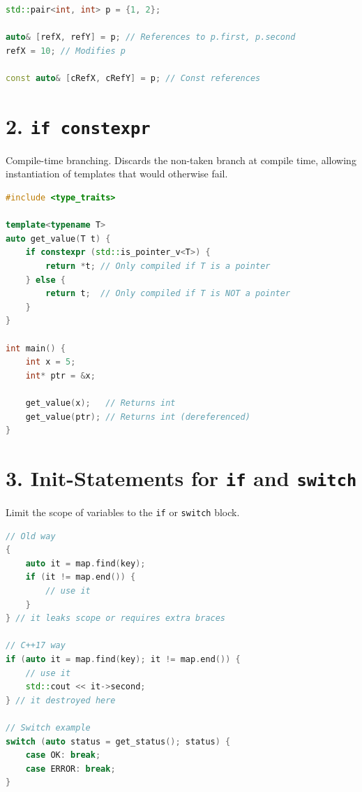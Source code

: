 \begin{lstlisting}[language={C++}]
std::pair<int, int> p = {1, 2};

auto& [refX, refY] = p; // References to p.first, p.second
refX = 10; // Modifies p

const auto& [cRefX, cRefY] = p; // Const references
\end{lstlisting}

\hypertarget{if-constexpr}{%
\section{\texorpdfstring{2.
\texttt{if\ constexpr}}{2. if constexpr}}\label{if-constexpr}}

Compile-time branching. Discards the non-taken branch at compile time,
allowing instantiation of templates that would otherwise fail.

\begin{lstlisting}[language={C++}]
#include <type_traits>

template<typename T>
auto get_value(T t) {
    if constexpr (std::is_pointer_v<T>) {
        return *t; // Only compiled if T is a pointer
    } else {
        return t;  // Only compiled if T is NOT a pointer
    }
}

int main() {
    int x = 5;
    int* ptr = &x;
    
    get_value(x);   // Returns int
    get_value(ptr); // Returns int (dereferenced)
}
\end{lstlisting}

\hypertarget{init-statements-for-if-and-switch}{%
\section{\texorpdfstring{3. Init-Statements for \texttt{if} and
\texttt{switch}}{3. Init-Statements for if and switch}}\label{init-statements-for-if-and-switch}}

Limit the scope of variables to the \passthrough{\lstinline!if!} or
\passthrough{\lstinline!switch!} block.

\begin{lstlisting}[language={C++}]
// Old way
{
    auto it = map.find(key);
    if (it != map.end()) {
        // use it
    }
} // it leaks scope or requires extra braces

// C++17 way
if (auto it = map.find(key); it != map.end()) {
    // use it
    std::cout << it->second;
} // it destroyed here

// Switch example
switch (auto status = get_status(); status) {
    case OK: break;
    case ERROR: break;
}
\end{lstlisting}

